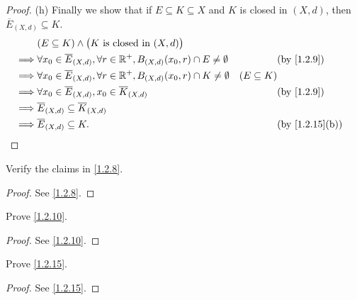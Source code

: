 \begin{proof}{(h)}
  Finally we show that if \(E \subseteq K \subseteq X\) and \(K\) is closed in \((X, d)\), then \(\overline{E}_{(X, d)} \subseteq K\).
  \begin{align*}
             & (E \subseteq K) \land \big(K \text{ is closed in } (X, d)\big)                                                                                       \\
    \implies & \forall x_0 \in \overline{E}_{(X, d)}, \forall r \in \R^+, B_{(X, d)}(x_0, r) \cap E \neq \emptyset &                 & \by{1.2.9}                   \\
    \implies & \forall x_0 \in \overline{E}_{(X, d)}, \forall r \in \R^+, B_{(X, d)}(x_0, r) \cap K \neq \emptyset & (E \subseteq K)                                \\
    \implies & \forall x_0 \in \overline{E}_{(X, d)}, x_0 \in \overline{K}_{(X, d)}                                &                 & \by{1.2.9}                   \\
    \implies & \overline{E}_{(X, d)} \subseteq \overline{K}_{(X, d)}                                                                                                \\
    \implies & \overline{E}_{(X, d)} \subseteq K.                                                                  &                 & \text{(by \cref{1.2.15}(b))}
  \end{align*}
\end{proof}

\exercisesection

\begin{ex}\label{ex:1.2.1}
  Verify the claims in \cref{1.2.8}.
\end{ex}

\begin{proof}
  See \cref{1.2.8}.
\end{proof}

\begin{ex}\label{ex:1.2.2}
  Prove \cref{1.2.10}.
\end{ex}

\begin{proof}
  See \cref{1.2.10}.
\end{proof}

\begin{ex}\label{ex:1.2.3}
  Prove \cref{1.2.15}.
\end{ex}

\begin{proof}
  See \cref{1.2.15}.
\end{proof}

